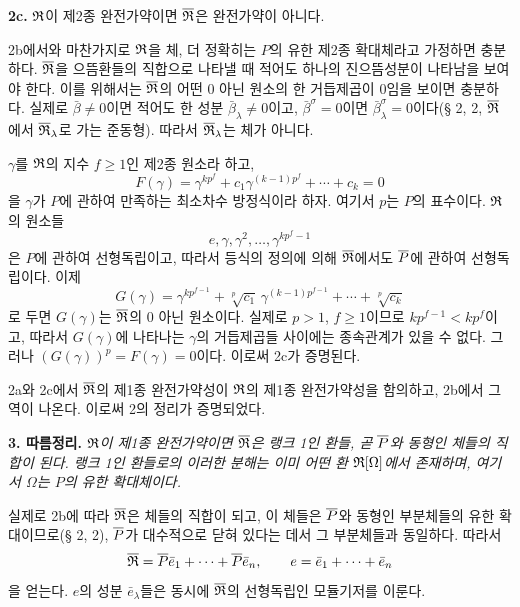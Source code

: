 \textbf{2c.} \(\mathfrak{R}\)이 제2종 완전가약이면 \(\overline{\mathfrak R}\)은 완전가약이 아니다.

2b에서와 마찬가지로 \(\mathfrak{R}\)을 체, 더 정확히는 \(P\)의 유한 제2종 확대체라고 가정하면 충분하다. \(\overline{\mathfrak R}\)을 으뜸환들의 직합으로 나타낼 때 적어도 하나의 진으뜸성분이 나타남을 보여야 한다. 이를 위해서는 \(\overline{\mathfrak R}\)의 어떤 0 아닌 원소의 한 거듭제곱이 0임을 보이면 충분하다. 실제로 \(\bar\beta\ne0\)이면 적어도 한 성분 \(\bar\beta_\lambda\ne0\)이고, \(\bar\beta^\sigma=0\)이면 \(\bar\beta_\lambda^\sigma=0\)이다(§ 2, 2, \(\overline{\mathfrak R}\)에서 \(\overline{\mathfrak R}_\lambda\)로 가는 준동형). 따라서 \(\overline{\mathfrak R}_\lambda\)는 체가 아니다.

\(\gamma\)를 \(\mathfrak{R}\)의 지수 \(f\ge1\)인 제2종 원소라 하고,
\[
        F(\gamma)=\gamma^{kp^f}+c_1\gamma^{(k-1)p^f}+\cdots+c_k=0
\]
을 \(\gamma\)가 \(P\)에 관하여 만족하는 최소차수 방정식이라 하자. 여기서 \(p\)는 \(P\)의 표수이다. \(\mathfrak{R}\)의 원소들
\[
        e,\gamma,\gamma^2,\ldots,\gamma^{kp^f-1}
\]
은 \(P\)에 관하여 선형독립이고, 따라서 등식의 정의에 의해 \(\overline{\mathfrak R}\)에서도 \(\overline P\)에 관하여 선형독립이다. 이제
\[
        G(\gamma)=\gamma^{kp^{f-1}}+\sqrt[p]{c_1}\,\gamma^{(k-1)p^{f-1}}+\cdots+\sqrt[p]{c_k}
\]
로 두면 \(G(\gamma)\)는 \(\overline{\mathfrak R}\)의 0 아닌 원소이다. 실제로 \(p>1\), \(f\ge1\)이므로 \(kp^{f-1}<kp^f\)이고, 따라서 \(G(\gamma)\)에 나타나는 \(\gamma\)의 거듭제곱들 사이에는 종속관계가 있을 수 없다. 그러나 \((G(\gamma))^p=F(\gamma)=0\)이다. 이로써 2c가 증명된다.

2a와 2c에서 \(\overline{\mathfrak R}\)의 제1종 완전가약성이 \(\mathfrak{R}\)의 제1종 완전가약성을 함의하고, 2b에서 그 역이 나온다. 이로써 2의 정리가 증명되었다.

\textbf{3. 따름정리.} \emph{\(\mathfrak{R}\)이 제1종 완전가약이면 \(\overline{\mathfrak R}\)은 랭크 1인 환들, 곧 \(\overline P\)와 동형인 체들의 직합이 된다. 랭크 1인 환들로의 이러한 분해는 이미 어떤 환 \(\mathfrak{R}[\Omega]\)에서 존재하며, 여기서 \(\Omega\)는 \(P\)의 유한 확대체이다.}

실제로 2b에 따라 \(\overline{\mathfrak R}\)은 체들의 직합이 되고, 이 체들은 \(\overline P\)와 동형인 부분체들의 유한 확대이므로(§ 2, 2), \(\overline P\)가 대수적으로 닫혀 있다는 데서 그 부분체들과 동일하다. 따라서
\[
        \overline{\mathfrak R}=\overline P\bar e_1+\cdots+\overline P\bar e_n,
        \qquad e=\bar e_1+\cdots+\bar e_n
\]
을 얻는다. \(e\)의 성분 \(\bar e_\lambda\)들은 동시에 \(\overline{\mathfrak R}\)의 선형독립인 모듈기저를 이룬다.

